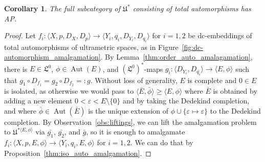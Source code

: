 \documentclass[oneside,notitlepage,12pt]{article}
\newtheorem{wn}[tw]{Corollary}
\theoremstyle{definition}
\theoremstyle{remark}
\newcommand \set [1]{\{#1\}}
\newcommand \seq [1]{\langle #1 \rangle}
\newcommand \maps {\colon} %
\newcommand \cmp {\circ} %
\newcommand \eps {\varepsilon}
\newcommand \Lin {\mathfrak{L}}
\newcommand \Ult {\mathfrak{U}}
\newcommand \Aut {\operatorname{Aut}}
\let \aut \Aut
\begin{document}
\begin{wn} \label{thm:dc_auto_amalgamation}
    The full subcategory of $\Ult^*$ consisting of total automorphisms has AP.
\end{wn}
\begin{proof}
    Let $f_i\maps \seq{X, p, D_X, D_p} \to \seq{Y_i, q_i, D_{Y_i}, D_{q_i}}$ for $i = 1, 2$ be dc-embeddings of total automorphisms of ultrametric spaces, as in Figure~\ref{fig:dc-automorphism_amalgamation}.
    By Lemma~\ref{thm:order_auto_amalagamation}, there is $E \in \Lin^0$, $\phi \in \aut(E)$, and $(\Lin^0)^*$-maps $g_i\maps \seq{D_{Y_i}, D_{q_i}} \to \seq{E, \phi}$ such that $g_1 \cmp D_{f_1} = g_2 \cmp D_{f_2} =: g$.
    Without loss of generality, $E$ is complete and $0 \in E$ is isolated, as otherwise we would pass to $\seq{\bar{E}, \bar{\phi}} \geq \seq{E, \phi}$ where $\bar{E}$ is obtained by adding a new element $0 < \eps < E \setminus \set{0}$ and by taking the Dedekind completion, and where $\bar{\phi} \in \aut(\bar{E})$ is the unique extension of $\phi \cup \set{\eps \mapsto \eps}$ to the Dedekind completion.
    By Observation~\ref{obs:liftings}, we can lift the amalgamation problem to $\Ult^{*\seq{E, \phi}}$ via $\bar{g_1}$, $\bar{g_2}$, and $\bar{g}$, so it is enough to amalgamate $f_i\maps \seq{X, p, E, \phi} \to \seq{Y_i, q_i, E, \phi}$ for $i = 1, 2$. We can do that by Proposition~\ref{thm:iso_auto_amalgamation}.
\end{proof}
\end{document}
